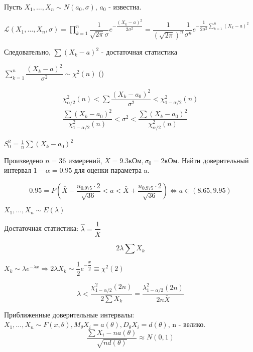\begin{ex}
  Пусть $X_1, \dots, X_n \sim N(a_0, \sigma)$, $a_0$ - известна.

  $\mathscr{L} (X_1, \dots, X_n, \sigma) = \prod\limits_{k=1}^n \dfrac{1}{\sqrt{2\pi} \sigma} e^{-\dfrac{(X_k - a)^2}{2\sigma^2}} = \dfrac{1}{(\sqrt{2\pi})^n} \dfrac{1}{\sigma^n} e^{-\dfrac{1}{2\sigma^2} \sum_{k=1}^n (X_k-a)^2}$

  Следовательно, $\sum (X_k-a)^2$ - достаточная статистика

  $\sum\limits_{k=1}^n \dfrac{(X_k-a)^2}{\sigma^2} \sim \chi^2 (n)$ ()

  \begin{gather*} 
    \chi^2_{\alpha/2} (n) < \sum \dfrac{(X_k - a_0)^2}{\sigma^2} < \chi^2_{1 - \alpha/2} (n) \\
    \dfrac{\sum (X_k-a_0)^2}{\chi^2_{1 - \alpha/2} (n)} < \sigma^2 < \dfrac{\sum (X_k - a_0)^2}{\chi^2_{\alpha/2}(n)} 
  \end{gather*}

  $S_0^2 = \frac{1}{n} \sum (X_k-a_0)^2$ %
\end{ex}

\begin{ex}
  Произведено $n=36$ измерений, $\bar X = 9.3 \text{кОм},  \sigma_0 = 2 \text{кОм}$. Найти доверительный интервал $1- \alpha = 0.95$ для оценки параметра a.

\[
  0.95 = P\left(\bar X - \dfrac{u_{0.975} \cdot 2}{\sqrt{36}} < a < \bar X + \dfrac{u_{0.975} \cdot 2}{\sqrt{36}}\right) \Leftrightarrow a \in (8.65, 9.95)
\]
\end{ex}

\begin{ex}
  $X_1, \dots, X_n \sim E(\lambda)$

  Достаточная статистика: $\hat \lambda = \dfrac{1}{\bar X}$

  $$2\lambda \sum X_k$$

  $X_k \sim \lambda e^{-\lambda x} \Rightarrow 2\lambda X_k \sim \dfrac{1}{2} e^{-\dfrac{x}{2}} \equiv \chi^2 (2)$

  $$\lambda < \dfrac{\chi^2_{1-\alpha/2} (2n)}{2 \sum X_k} = \dfrac{\lambda^2_{1-\alpha/2} (2n)}{2n \bar X}$$
\end{ex}

  Приближенные доверительные интервалы:
  $X_1, \dots, X_n \sim F(x, \theta), M_\theta X_i = a(\theta), D_\theta X_i = d(\theta)$, n - велико. 
  $$\dfrac{\sum X_i - n a(\theta)}{\sqrt{n d(\theta)}} \approx N(0, 1)$$

